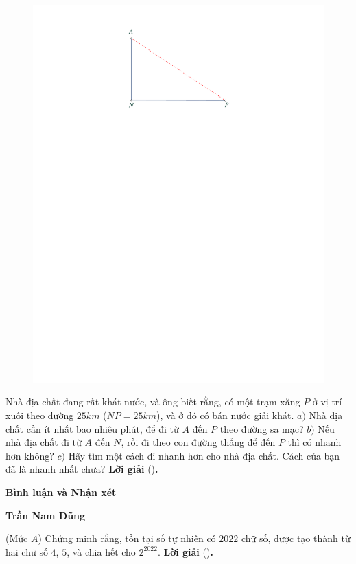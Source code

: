 \begin{multicols}{2}
	\begin{figure}[H]
		\centering
		\vspace*{-10pt}
		\captionsetup{labelformat= empty, justification=centering}
		\includegraphics[width=0.75\linewidth]{P597}
		\vspace*{-5pt}
	\end{figure}
	Nhà địa chất đang rất khát nước, và ông biết rằng, có một trạm xăng $P$ ở vị trí xuôi theo đường $25km$ ($NP = 25km$), và ở đó có bán nước giải khát.
	\vskip 0.05cm
	$a)$ Nhà địa chất cần ít nhất bao nhiêu phút, để đi từ $A$ đến $P$ theo đường sa mạc?
	\vskip 0.05cm
	$b)$ Nếu nhà địa chất đi từ $A$ đến $N$, rồi đi theo con đường thẳng để đến $P$ thì có nhanh hơn không?
	\vskip 0.05cm
	$c)$ Hãy tìm một cách đi nhanh hơn cho nhà địa chất. Cách của bạn đã là nhanh nhất chưa?
	\vskip 0.05cm
	\textbf{Lời giải} ()\textbf{.}
	\vskip 0.05cm
	
	\textbf{Bình luận và Nhận xét}
	
	\begin{flushright}
		\textbf{Trần Nam Dũng}
	\end{flushright}
	{}
	(Mức $A$) Chứng minh rằng, tồn tại số tự nhiên có $2022$ chữ số, được tạo thành từ hai chữ số $4$, $5$, và chia hết cho $2^{2022}$. 
	\vskip 0.05cm
	\textbf{Lời giải} ()\textbf{.}
	

\end{multicols}
